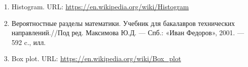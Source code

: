 \documentclass[../main.tex]{subfiles}
\begin{document}
    \begin{enumerate}
        \item \newline Histogram. URL: \url{https://en.wikipedia.org/wiki/Histogram}
        \item \newline Вероятностные разделы математики. Учебник для бакалавров технических направлений.//Под ред. Максимова Ю.Д. — Спб.: «Иван Федоров»,
        2001. — 592 c., илл.
        \item \newline Box plot. URL: \url{https://en.wikipedia.org/wiki/Box_plot}
     \end{enumerate}
\end{document}
